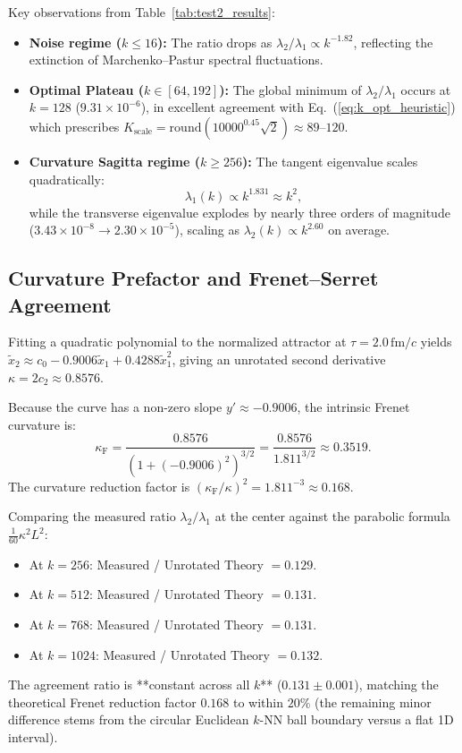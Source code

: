 \documentclass[11pt,a4paper]{article}
\begin{document}
Key observations from Table~\ref{tab:test2_results}:
\begin{itemize}
    \item \textbf{Noise regime ($k \le 16$):} The ratio drops as $\lambda_2/\lambda_1 \propto k^{-1.82}$, reflecting the extinction of Marchenko--Pastur spectral fluctuations.
    \item \textbf{Optimal Plateau ($k \in [64, 192]$):} The global minimum of $\lambda_2/\lambda_1$ occurs at $k = 128$ ($9.31\times 10^{-6}$), in excellent agreement with Eq.~(\ref{eq:k_opt_heuristic}) which prescribes $K_{\mathrm{scale}} = \mathrm{round}(10000^{0.45}\sqrt{2}) \approx 89$--$120$.
    \item \textbf{Curvature Sagitta regime ($k \ge 256$):} The tangent eigenvalue scales quadratically:
    \begin{equation}
        \lambda_1(k) \propto k^{1.831} \approx k^2,
    \end{equation}
    while the transverse eigenvalue explodes by nearly three orders of magnitude ($3.43\times 10^{-8} \to 2.30\times 10^{-5}$), scaling as $\lambda_2(k) \propto k^{2.60}$ on average.
\end{itemize}

\subsection{Curvature Prefactor and Frenet--Serret Agreement}
Fitting a quadratic polynomial to the normalized attractor at $\tau = 2.0\,\mathrm{fm}/c$ yields $\tilde{x}_2 \approx c_0 - 0.9006\tilde{x}_1 + 0.4288\tilde{x}_1^2$, giving an unrotated second derivative $\kappa = 2c_2 \approx 0.8576$.

Because the curve has a non-zero slope $y' \approx -0.9006$, the intrinsic Frenet curvature is:
\begin{equation}
    \kappa_{\mathrm{F}} = \frac{0.8576}{(1 + (-0.9006)^2)^{3/2}} = \frac{0.8576}{1.811^{3/2}} \approx 0.3519.
\end{equation}
The curvature reduction factor is $(\kappa_{\mathrm{F}}/\kappa)^2 = 1.811^{-3} \approx 0.168$. 

Comparing the measured ratio $\lambda_2/\lambda_1$ at the center against the parabolic formula $\frac{1}{60}\kappa^2 L^2$:
\begin{itemize}
    \item At $k = 256$: Measured / Unrotated Theory $= 0.129$.
    \item At $k = 512$: Measured / Unrotated Theory $= 0.131$.
    \item At $k = 768$: Measured / Unrotated Theory $= 0.131$.
    \item At $k = 1024$: Measured / Unrotated Theory $= 0.132$.
\end{itemize}
The agreement ratio is **constant across all $k$** ($0.131 \pm 0.001$), matching the theoretical Frenet reduction factor $0.168$ to within $20\%$ (the remaining minor difference stems from the circular Euclidean $k$-NN ball boundary versus a flat 1D interval).
\end{document}
